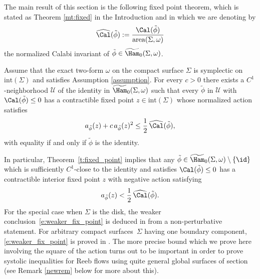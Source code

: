 The main result of this section is the following fixed point theorem, which is stated as Theorem \ref{mt:fixed} in the Introduction and in which we are denoting by
\[
\widehat{\Cal} (\tilde{\phi}) := \frac{\Cal(\tilde{\phi})}{\mathrm{area}(\Sigma,\omega)}
\]
the normalized Calabi invariant of $\tilde\phi\in \widetilde{\Ham}_0(\Sigma,\omega)$.

\begin{thm}
\label{t:fixed_point}
Assume that the exact two-form $\omega$ on the compact surface $\Sigma$ is symplectic on $\mathrm{int}(\Sigma)$ and satisfies Assumption \ref{assumption}.
For every $c> 0$ there exists a $C^1$\nobreakdash-neigh\-borhood $\mathcal{U}$ of the identity in $\widetilde{\Ham}_0(\Sigma,\omega)$ such that every $\tilde{\phi}$ in $\mathcal{U}$ with $\Cal(\tilde{\phi})\leq\nobreak 0$ has a contractible fixed point $z\in \mathrm{int}(\Sigma)$ whose normalized action satisfies
\begin{equation}
\label{actionbound}
a_{\tilde{\phi}}(z) + c\, a_{\tilde{\phi}}(z)^2 \leq \frac{1}{2}\, \widehat{\Cal}(\tilde{\phi}),
\end{equation}
with equality if and only if $\tilde{\phi}$ is the identity.
\end{thm}

In particular, Theorem~\ref{t:fixed_point} implies that any $\tilde{\phi} \in \widetilde{\Ham}_0(\Sigma,\omega)\setminus\{\id\}$ which is sufficiently $C^1$-close to the identity and satisfies $\Cal(\tilde{\phi})\leq 0$ has a contractible interior fixed point $z$ with negative action satisfying
\begin{equation}
\label{e:weaker_fix_point}
a_{\tilde{\phi}}(z) < \frac{1}{2}\, \widehat{\Cal}(\tilde{\phi}).
\end{equation}
For the special case when $\Sigma$ is the disk, the weaker conclusion~\eqref{e:weaker_fix_point} is deduced in \cite[Cor.\,5]{Abbondandolo:2018fb} from a non-perturbative statement. For arbitrary compact surfaces~$\Sigma$ having one boundary component, \eqref{e:weaker_fix_point} is proved in \cite[Cor.\,4.16]{Benedetti:2021aa}. The more precise bound which we prove here involving the square of the action turns out to be important in order to prove systolic inequalities for Reeb flows using quite general global surfaces of section (see Remark \ref{newrem} below for more about this).

